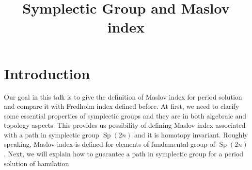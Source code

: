 \documentclass[a4paper,11pt]{amsart}
\title{Symplectic Group and Maslov index}
\DeclareMathOperator{\Sp}{Sp}
\theoremstyle{plain}
\theoremstyle{theorem}
\theoremstyle{definition}
\begin{document}
	\maketitle
\section{Introduction}
Our goal in this talk is to give the definition of Maslov index for period solution and compare it with Fredholm index defined before. At first, we need to clarify some essential properties of symplectic groups and they are in both algebraic and topology aspects. This provides us possibility of defining Maslov index associated with a path in symplectic group $\Sp(2n)$ and it is homotopy invariant. Roughly speaking, Maslov index is defined for elements of fundamental group of $\Sp(2n)$. Next, we will explain how to guarantee a path in symplectic group for a period solution of hamilation
\end{document}
